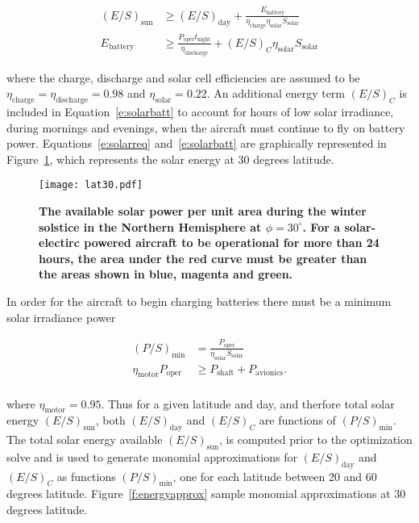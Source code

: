 \documentclass[]{aiaa-tc}%
\begin{document}
\begin{align}
    \label{e:solarreq}
    (E/S)_{\text{sun}}  &\geq (E/S)_{\text{day}} + \frac{E_{\text{battery}}}{\eta_{\text{charge}}\eta_{\text{solar}} S_{\text{solar}}} \\
    \label{e:solarbatt}
    E_{\text{battery}} &\geq \frac{P_{\text{oper}}t_{\text{night}}}{\eta_{\text{discharge}}} + (E/S)_C \eta_{\text{solar}} S_{\text{solar}}
\end{align}

where the charge, discharge and solar cell efficiencies are assumed to be $\eta_{\text{charge}} = \eta_{\text{discharge}} = 0.98$ and $\eta_{\text{solar}}= 0.22$. 
An additional energy term $(E/S)_C$ is included in Equation~\ref{e:solarbatt} to account for hours of low solar irradiance, during mornings and evenings, when the aircraft must continue to fly on battery power. 
Equations~\ref{e:solarreq} and~\ref{e:solarbatt} are graphically represented in Figure~\ref{f:lat30}, which represents the solar energy at 30 degrees latitude. 

\begin{figure}[H]
	\begin{center}
	\texttt{[image: lat30.pdf]}
    \caption{\textbf{The available solar power per unit area during the winter solstice in the Northern Hemisphere at $\phi=30^{\circ}$. For a solar-electirc powered aircraft to be operational for more than 24 hours, the area under the red curve must be greater than the areas shown in blue, magenta and green.}}
	\label{f:lat30}
	\end{center}
\end{figure}

In order for the aircraft to begin charging batteries there must be a minimum solar irradiance power

\begin{align}
    (P/S)_{\text{min}} &= \frac{P_{\text{oper}}}{\eta_{\text{solar}} S_{\text{solar}}} \\
    \eta_{\text{motor}} P_{\text{oper}} &\geq P_{\text{shaft}} + P_{\text{avionics}}. \\
\end{align}

where $\eta_{\text{motor}} = 0.95$. Thus for a given latitude and day, and therfore total solar energy $(E/S)_{\text{sun}}$, both $(E/S)_{\text{day}}$ and $(E/S)_C$ are functions of $(P/S)_{\text{min}}$.  
The total solar energy available $(E/S)_{\text{sun}}$, is computed prior to the optimization solve and is used to generate monomial approximations for $(E/S)_{\text{day}}$ and $(E/S)_C$ as functions $(P/S)_{\text{min}}$, one for each latitude between 20 and 60 degrees latitude. 
Figure~\ref{f:energyapprox} sample monomial approximations at 30 degrees latitude. 
\end{document}
